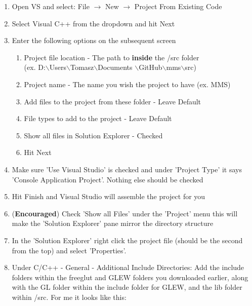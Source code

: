 \documentclass[12pt]{article}
\begin{document}
\begin{enumerate}

\item Open VS and select: File $\rightarrow$ New $\rightarrow$ Project From
Existing Code

\item Select Visual C++ from the dropdown and hit Next

\item Enter the following options on the subsequent screen

    \begin{enumerate}

    \item Project file location - The path to \textbf{inside} the /src folder\\
    (ex. D:$\backslash$Users$\backslash$Tomasz$\backslash$Documents
    $\backslash$GitHub$\backslash$mms$\backslash$src)

    \item Project name - The name you wish the project to have (ex. MMS)

    \item Add files to the project from these folder - Leave Default

    \item File types to add to the project - Leave Default

    \item Show all files in Solution Explorer - Checked
   
    \item Hit Next

    \end{enumerate}

\item Make sure 'Use Visual Studio' is checked and under 'Project Type' it says
'Console Application Project'.  Nothing else should be checked

\item Hit Finish and Visual Studio will assemble the project for you

\item (\textbf{Encouraged}) Check 'Show all Files' under the 'Project' menu
this will make the 'Solution Explorer' pane mirror the directory structure
   
\item In the 'Solution Explorer' right click the project file (should be the
second from the top) and select 'Properties'.

\item Under C/C++ - General - Additional Include Directories: Add the include
folders within the freeglut and GLEW folders you downloaded earlier, along with
the GL folder within the include folder for GLEW, and the lib folder within
/src.  For me it looks like this:
    

\end{enumerate}
\end{document}
